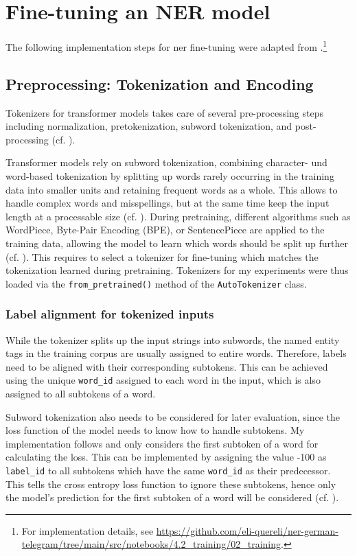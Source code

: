 \section{Fine-tuning an NER model}

The following implementation steps for \gls{ner} fine-tuning were adapted from \cite[87-122]{tunstall_natural_2022}.\footnote{For implementation details, see \url{https://github.com/eli-quereli/ner-german-telegram/tree/main/src/notebooks/4.2_training/02_training}.}

\subsection{Preprocessing: Tokenization and Encoding}
\label{sec:tokenization_and_encoding}

Tokenizers for transformer models takes care of several pre-processing steps including normalization, pretokenization, subword tokenization, and post-processing (cf. \cite[94-95]{tunstall_natural_2022}).  

Transformer models rely on subword tokenization, combining character- und word-based tokenization by splitting up words rarely occurring in the training data  into smaller units and retaining frequent words as a whole. This allows to handle complex words and misspellings, but at the same time keep the input length at a processable size (cf. \cite[33]{tunstall_natural_2022}). 
During pretraining, different algorithms such as WordPiece, Byte-Pair Encoding (BPE), or SentencePiece are applied to the training data, allowing the model to learn which words should be split up further (cf. \cite{huggingface_tokenizers}). This requires to select a tokenizer for fine-tuning which matches the tokenization learned during pretraining. Tokenizers for my experiments were thus loaded via the \verb|from_pretrained()| method of the \verb|AutoTokenizer| class.

\subsubsection{Label alignment for tokenized inputs}
While the tokenizer splits up the input strings into subwords, the named entity tags in the training corpus are usually assigned to entire words. Therefore, labels need to be aligned with their corresponding subtokens. This can be achieved using the unique \verb|word_id| assigned to each word in the input, which is also assigned to all subtokens of a word. 

Subword tokenization also needs to be considered for later evaluation, since the loss function of the model needs to know how to handle subtokens. My implementation follows \citeauthor{tunstall_natural_2022} and only considers the first subtoken of a word for calculating the loss. This can be implemented by assigning the value -100 as \verb|label_id| to all subtokens which have the same \verb|word_id| as their predecessor. This tells the cross entropy loss function to ignore these subtokens, hence only the model's prediction for the first subtoken of a word will be considered (cf. \cite[104]{tunstall_natural_2022}).  

